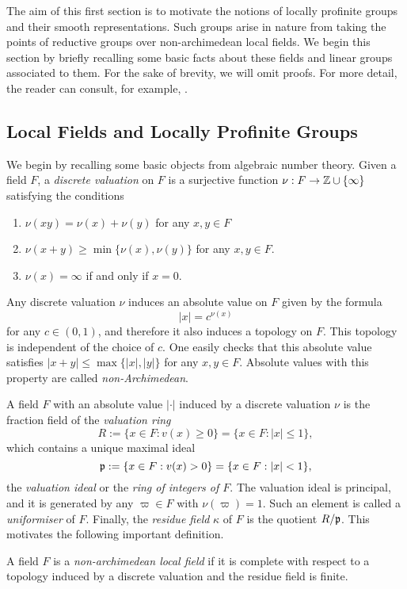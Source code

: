 The aim of this first section is to motivate the notions of locally profinite groups and their smooth representations. Such groups arise in nature from taking the points of reductive groups over non-archimedean local fields. We begin this section by briefly recalling some basic facts about these fields and linear groups associated to them. For the sake of brevity, we will omit proofs. For more detail, the reader can consult, for example, \cite{Gou1}.

\subsection{Local Fields and Locally Profinite Groups}
We begin by recalling some basic objects from algebraic number theory. Given a field $F$, a \textit{discrete valuation} on $F$ is a surjective function $\nu: F\to\mathbb{Z}\cup\{\infty\}$ satisfying the conditions

\begin{enumerate}
    \item $\nu(xy)=\nu(x)+\nu(y)$ for any $x,y\in F$ 
    \item $\nu(x+y)\geq\min\{\nu(x),\nu(y)\}$ for any $x,y\in F$.
    \item $\nu(x)=\infty$ if and only if $x=0$.
\end{enumerate}

Any discrete valuation $\nu$ induces an absolute value on $F$ given by the formula 
$$|x|=c^{\nu(x)}$$ 
for any $c\in(0,1)$, and therefore it also induces a topology on $F$. This topology is independent of the choice of $c$. One easily checks that this absolute value satisfies $|x+y|\leq\max\{|x|,|y|\}$ for any $x,y\in F$. Absolute values with this property are called \textit{non-Archimedean}. 

A field $F$ with an absolute value $|\cdot|$ induced by a discrete valuation $\nu$ is the fraction field of the \textit{valuation ring}
$$R:=\{x\in F:v(x)\geq 0\}=\{x\in F: |x|\leq1\},$$ 
which contains a unique maximal ideal
$$\mathfrak{p}:=\{x\in F:v(x)> 0\}=\{x\in F: |x|<1\},$$
the \textit{valuation ideal} or the \textit{ring of integers of $F$}. The valuation ideal is principal, and it is generated by any $\varpi\in F$ with $\nu(\varpi)=1$. Such an element is called a \textit{uniformiser} of $F$. Finally, the \textit{residue field} $\kappa$ of $F$ is the quotient $R/\mathfrak{p}$. This motivates the following important definition.

\begin{defn}
    A field $F$ is a \textit{non-archimedean local field} if it is complete with respect to a topology induced by a discrete valuation and the residue field is finite.
\end{defn}

